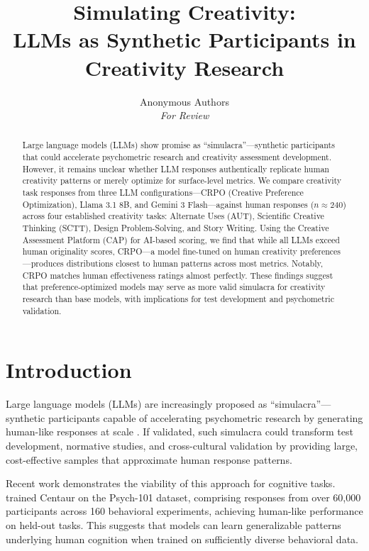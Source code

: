 \documentclass[11pt,twocolumn]{article}
\title{Simulating Creativity: \\
LLMs as Synthetic Participants in Creativity Research}
\author{
Anonymous Authors\\
\textit{For Review}
}
\date{}
\begin{document}
\raggedbottom

\maketitle

\begin{abstract}
Large language models (LLMs) show promise as ``simulacra''---synthetic participants that could accelerate psychometric research and creativity assessment development. However, it remains unclear whether LLM responses authentically replicate human creativity patterns or merely optimize for surface-level metrics. We compare creativity task responses from three LLM configurations---CRPO (Creative Preference Optimization), Llama 3.1 8B, and Gemini 3 Flash---against human responses ($n \approx 240$) across four established creativity tasks: Alternate Uses (AUT), Scientific Creative Thinking (SCTT), Design Problem-Solving, and Story Writing. Using the Creative Assessment Platform (CAP) for AI-based scoring, we find that while all LLMs exceed human originality scores, CRPO---a model fine-tuned on human creativity preferences---produces distributions closest to human patterns across most metrics. Notably, CRPO matches human effectiveness ratings almost perfectly. These findings suggest that preference-optimized models may serve as more valid simulacra for creativity research than base models, with implications for test development and psychometric validation.
\end{abstract}

\section{Introduction}

Large language models (LLMs) are increasingly proposed as ``simulacra''---synthetic participants capable of accelerating psychometric research by generating human-like responses at scale \citep{dillion2023can}. If validated, such simulacra could transform test development, normative studies, and cross-cultural validation by providing large, cost-effective samples that approximate human response patterns.

Recent work demonstrates the viability of this approach for cognitive tasks. \citet{binz2025centaur} trained Centaur on the Psych-101 dataset, comprising responses from over 60,000 participants across 160 behavioral experiments, achieving human-like performance on held-out tasks. This suggests that models can learn generalizable patterns underlying human cognition when trained on sufficiently diverse behavioral data.
\end{document}
